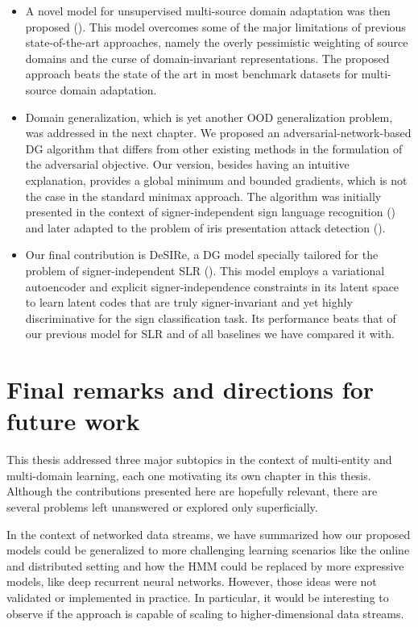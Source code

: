\begin{itemize}
    \item A novel model for unsupervised multi-source domain adaptation was then proposed (). This model overcomes some of the major limitations of previous state-of-the-art approaches, namely the overly pessimistic weighting of source domains and the curse of domain-invariant representations. The proposed approach beats the state of the art in most benchmark datasets for multi-source domain adaptation.
    \item Domain generalization, which is yet another OOD generalization problem, was addressed in the next chapter. We proposed an adversarial-network-based DG algorithm that differs from other existing methods in the formulation of the adversarial objective. Our version, besides having an intuitive explanation, provides a global minimum and bounded gradients, which is not the case in the standard minimax approach. The algorithm was initially presented in the context of signer-independent sign language recognition () and later adapted to the problem of iris presentation attack detection ().
    \item Our final contribution is DeSIRe, a DG model specially tailored for the problem of signer-independent SLR (). This model employs a variational autoencoder and explicit signer-independence constraints in its latent space to learn latent codes that are truly signer-invariant and yet highly discriminative for the sign classification task. Its performance beats that of our previous model for SLR and of all baselines we have compared it with.
\end{itemize}

\section{Final remarks and directions for future work}
This thesis addressed three major subtopics in the context of multi-entity and multi-domain learning, each one motivating its own chapter in this thesis. Although the contributions presented here are hopefully relevant, there are several problems left unanswered or explored only superficially.

In the context of networked data streams, we have summarized how our proposed models could be generalized to more challenging learning scenarios like the online and distributed setting and how the HMM could be replaced by more expressive models, like deep recurrent neural networks. However, those ideas were not validated or implemented in practice. In particular, it would be interesting to observe if the approach is  capable of scaling to higher-dimensional data streams.

